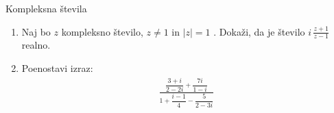 \begin{frame}{Kompleksna števila}
	\begin{enumerate}
		\item
		Naj bo $z$ kompleksno število, $z \ne 1$ in $|z|=1$  .
		Dokaži, da je število \( i \, \frac{z+1}{z-1} \) realno.
		\item
		Poenostavi izraz:
		\large
		\begin{align*}
		\frac{\dfrac{3+i}{2-2i}+\dfrac{7i}{1-i}}{1+\dfrac{i-1}{4}-\dfrac{5}{2-3i}}
		\end{align*}
	\end{enumerate}
\end{frame}